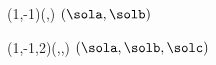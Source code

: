 \VECTORCOPY(1,-1)(\sola,\solb)
$(\sola,\solb)$

\VECTORCOPY(1,-1,2)(\sola,\solb,\solc)
$(\sola,\solb,\solc)$
